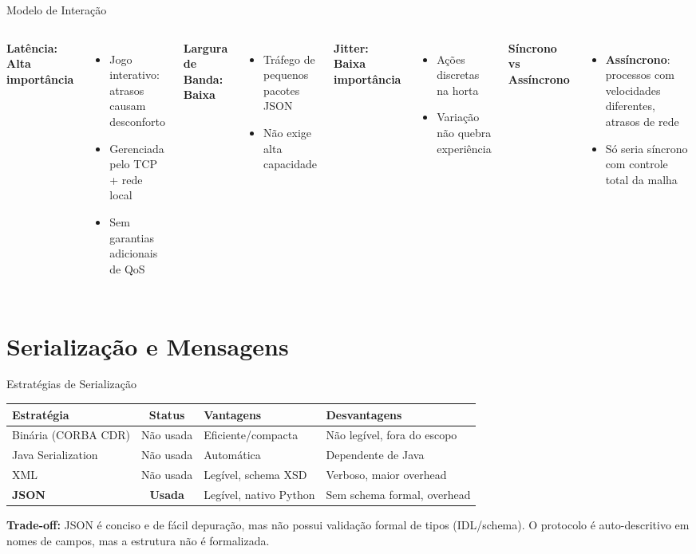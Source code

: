 \documentclass[aspectratio=169]{beamer}
\begin{document}
\begin{frame}{Modelo de Intera\c{c}\~ao}
  \begin{columns}
    \textbf{Lat\^encia: Alta import\^ancia}
    \begin{itemize}
      \item Jogo interativo: atrasos causam desconforto
      \item Gerenciada pelo TCP + rede local
      \item Sem garantias adicionais de QoS
    \end{itemize}
    \textbf{Largura de Banda: Baixa}
    \begin{itemize}
      \item Tr\'afego de pequenos pacotes JSON
      \item N\~ao exige alta capacidade
    \end{itemize}
    \textbf{Jitter: Baixa import\^ancia}
    \begin{itemize}
      \item A\c{c}\~oes discretas na horta
      \item Varia\c{c}\~ao n\~ao quebra experi\^encia
    \end{itemize}
    \textbf{S\'incrono vs Ass\'incrono}
    \begin{itemize}
      \item \textbf{Ass\'incrono}: processos com velocidades diferentes, atrasos de rede
      \item S\'o seria s\'incrono com controle total da malha
    \end{itemize}
  \end{columns}
\end{frame}

\section{Serializa\c{c}\~ao e Mensagens}

\begin{frame}{Estrat\'egias de Serializa\c{c}\~ao}
  \footnotesize
  \begin{tabular}{>{\raggedright\arraybackslash}p{3cm}c>{\raggedright\arraybackslash}p{4cm}>{\raggedright\arraybackslash}p{3cm}}
    \toprule
    \textbf{Estrat\'egia} & \textbf{Status} & \textbf{Vantagens} & \textbf{Desvantagens} \\
    \midrule
    Bin\'aria (CORBA CDR) & N\~ao usada & Eficiente/compacta & N\~ao leg\'ivel, fora do escopo \\
    Java Serialization & N\~ao usada & Autom\'atica & Dependente de Java \\
    XML & N\~ao usada & Leg\'ivel, schema XSD & Verboso, maior overhead \\
    \textbf{JSON} & \textbf{Usada} & Leg\'ivel, nativo Python & Sem schema formal, overhead \\
    \bottomrule
  \end{tabular}
  \vfill
  \textbf{Trade-off:} JSON \'e conciso e de f\'acil depura\c{c}\~ao, mas n\~ao possui valida\c{c}\~ao formal de tipos (IDL/schema). O protocolo \'e auto-descritivo em nomes de campos, mas a estrutura n\~ao \'e formalizada.
\end{frame}
\end{document}
